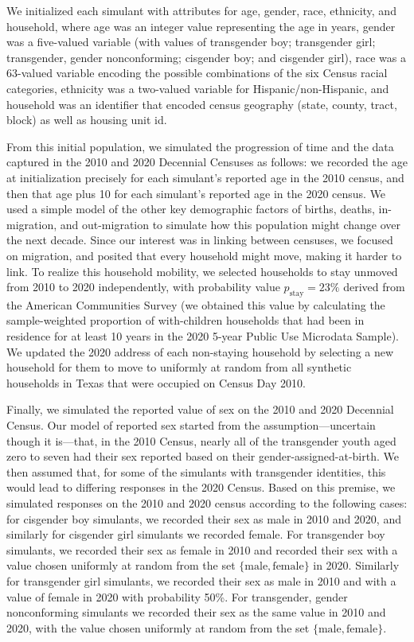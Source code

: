 \documentclass{jpc} %
\theoremstyle{plain}\newtheorem{satz}[thm]{Satz} %
\begin{document}
We initialized each simulant with attributes for age, gender, race, ethnicity, and household, where age was an integer value representing the age in years, gender was a five-valued variable (with values of transgender boy; transgender girl; transgender, gender nonconforming; cisgender boy; and cisgender girl), race was a 63-valued variable encoding the possible combinations of the six Census racial categories, ethnicity was a two-valued variable for Hispanic/non-Hispanic, and household was an identifier that encoded census geography (state, county, tract, block) as well as housing unit id.

From this initial population, we simulated the progression of time and the data captured in the 2010 and 2020 Decennial Censuses as follows: we recorded the age at initialization precisely for each simulant's reported age in the 2010 census, and then that age plus 10 for each simulant's reported age in the 2020 census.  We used a simple model of the other key demographic factors of births, deaths, in-migration, and out-migration to simulate how this population might change over the next decade. Since our interest was in linking between censuses, we focused on migration, and posited that every household might move, making it harder to link. To realize this household mobility, we selected households to stay unmoved from 2010 to 2020 independently, with probability value $p_{\text{stay}} = 23\%$ derived from the American Communities Survey (we obtained this value by calculating the sample-weighted proportion of with-children households that had been in residence for at least 10 years in the 2020 5-year Public Use Microdata Sample).  We updated the 2020 address of each non-staying household by selecting a new household for them to move to uniformly at random from all synthetic households in Texas that were occupied on Census Day 2010.

Finally, we simulated the reported value of sex on the 2010 and 2020 Decennial Census. Our model of reported sex started from the assumption---uncertain though it is---that, in the 2010 Census, nearly all of the transgender youth aged zero to seven had their sex reported based on their gender-assigned-at-birth. We then assumed that, for some of the simulants with transgender identities, this would lead to differing responses in the 2020 Census.
Based on this premise, we simulated responses on the 2010 and 2020 census according to the following cases: for cisgender boy simulants, we recorded their sex as male in 2010 and 2020, and similarly for cisgender girl simulants we recorded female.  For transgender boy simulants, we recorded their sex as female in 2010 and recorded their sex with a value chosen uniformly at random from the set $\{\text{male}, \text{female}\}$ in 2020.  Similarly for transgender girl simulants, we recorded their sex as male in 2010 and with a value of female in 2020 with probability 50\%.  For transgender, gender nonconforming simulants we recorded their sex as the same value in 2010 and 2020, with the value chosen uniformly at random from the set $\{\text{male}, \text{female}\}$.
\end{document}
